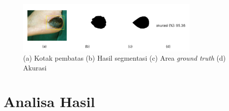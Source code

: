 \begin{figure}[H]
	\centering
	\includegraphics[width=0.8\textwidth]{gambar/hasil_bab4.jpg}
	\caption{(a) Kotak pembatas (b) Hasil segmentasi (c) Area \emph{ground truth} (d) Akurasi}
	\label{img:hasil_segmentasi}
\end{figure}

\section{Analisa Hasil}

